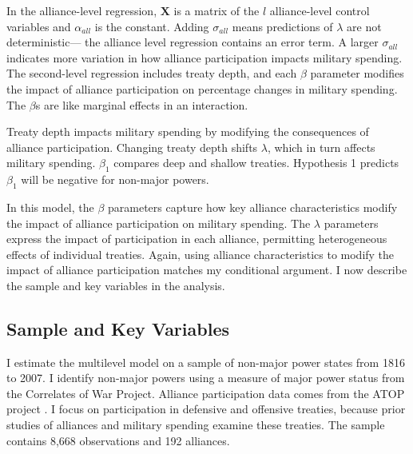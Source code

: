 \documentclass[12pt]{article}
\begin{document}
In the alliance-level regression, $\textbf{X}$ is a matrix of the $l$ alliance-level control variables and $\alpha_{all}$ is the constant.
Adding $\sigma_{all}$ means predictions of $\lambda$ are not deterministic--- the alliance level regression contains an error term. 
A larger $\sigma_{all}$ indicates more variation in how alliance participation impacts military spending. 
The second-level regression includes treaty depth, and each $\beta$ parameter modifies the impact of alliance participation on percentage changes in military spending. 
The $\beta$s are like marginal effects in an interaction. 


Treaty depth impacts military spending by modifying the consequences of alliance participation. 
Changing treaty depth shifts $\lambda$, which in turn affects military spending.
$\beta_1$ compares deep and shallow treaties. 
Hypothesis 1 predicts $\beta_1$ will be negative for non-major powers. 


In this model, the $\beta$ parameters capture how key alliance characteristics modify the impact of alliance participation on military spending. 
The $\lambda$ parameters express the impact of participation in each alliance, permitting heterogeneous effects of individual treaties. 
Again, using alliance characteristics to modify the impact of alliance participation matches my conditional argument. 
I now describe the sample and key variables in the analysis.  



\subsection*{Sample and Key Variables} 

I estimate the multilevel model on a sample of non-major power states from 1816 to 2007. 
I identify non-major powers using a measure of major power status from the Correlates of War Project. 
Alliance participation data comes from the ATOP project \citep{Leedsetal2002}.  
I focus on participation in defensive and offensive treaties, because prior studies of alliances and military spending examine these treaties. 
The sample contains 8,668 observations and 192 alliances. 
\end{document}
